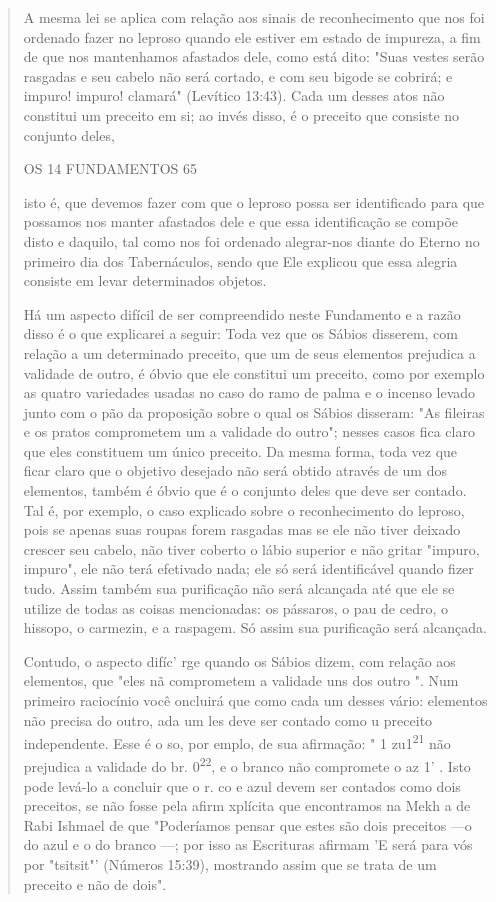 \begin{quote}
A mesma lei se aplica com relação aos sinais de reconhecimento que nos
foi ordenado fazer no leproso quando ele estiver em estado de impureza,
a fim de que nos mantenhamos afastados dele, como está dito: "Suas
vestes serão rasgadas e seu cabelo não será cortado, e com seu bigode se
cobrirá; e impuro! impuro! clamará" (Levítico 13:43). Cada um desses
atos não constitui um preceito em si; ao invés disso, é o preceito que
consiste no conjunto deles,

OS 14 FUNDAMENTOS 65

isto é, que devemos fazer com que o leproso possa ser identificado para
que possamos nos manter afastados dele e que essa identificação se
compõe disto e daquilo, tal como nos foi ordenado alegrar-nos diante do
Eterno no primeiro dia dos Tabernáculos, sendo que Ele explicou que essa
alegria consiste em le­var determinados objetos.

Há um aspecto difícil de ser compreendido neste Fundamento e a razão
disso é o que explicarei a seguir: Toda vez que os Sábios disserem, com
relação a um determinado preceito, que um de seus elementos prejudica a
vali­dade de outro, é óbvio que ele constitui um preceito, como por
exemplo as quatro variedades usadas no caso do ramo de palma e o incenso
levado junto com o pão da proposição sobre o qual os Sábios disseram:
"As fileiras e os pra­tos comprometem um a validade do outro"; nesses
casos fica claro que eles constituem um único preceito. Da mesma forma,
toda vez que ficar claro que o objetivo desejado não será obtido através
de um dos elementos, também é óbvio que é o conjunto deles que deve ser
contado. Tal é, por exemplo, o caso explicado sobre o reconhecimento do
leproso, pois se apenas suas roupas fo­rem rasgadas mas se ele não tiver
deixado crescer seu cabelo, não tiver coberto o lábio superior e não
gritar "impuro, impuro", ele não terá efetivado nada; ele só será
identificável quando fizer tudo. Assim também sua purificação não será
alcançada até que ele se utilize de todas as coisas mencionadas: os
pássa­ros, o pau de cedro, o hissopo, o carmezin, e a raspagem. Só assim
sua purifica­ção será alcançada.

Contudo, o aspecto difíc' rge quando os Sábios dizem, com rela­ção aos
elementos, que "eles nã comprometem a validade uns dos outro ". Num
primeiro raciocínio você oncluirá que como cada um desses vário:
ele­mentos não precisa do outro, ada um les deve ser contado como u
pre­ceito independente. Esse é o so, por emplo, de sua afirmação: " 1
zu1\textsuperscript{21} não prejudica a validade do br.
0\textsuperscript{22}, e o branco não compromete o az 1' . Isto pode
levá-lo a concluir que o r. co e azul devem ser contados como dois
preceitos, se não fosse pela afirm xplícita que encontramos na Mekh a de
Rabi Ishmael de que "Poderíamos pensar que estes são dois preceitos ---o
do azul e o do branco ---; por isso as Escrituras afirmam 'E será para
vós por "tsitsit"' (Números 15:39), mostrando assim que se trata de um
preceito e não de dois".


\end{quote}
